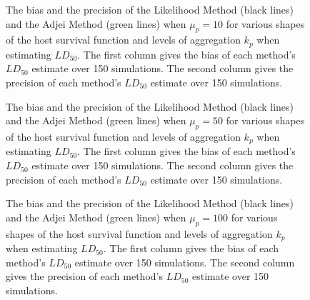 \documentclass[12pt, a4paper]{article}
\begin{document}
\begin{figure}


    \captionsetup{justification=raggedright, singlelinecheck=false}

    \caption{\doublespacing The bias and the precision of the Likelihood Method (black lines) and the Adjei Method (green lines) when $\mu_p = 10$ for various shapes of the host survival function and levels of aggregation $k_p$ when estimating $LD_{50}$.  The first column gives the bias of each method's $LD_{50}$ estimate over 150 simulations. The second column gives the precision of each method's $LD_{50}$ estimate over 150 simulations.}

    \label{fig:biasld50_10}

\end{figure}

\begin{figure}


    \captionsetup{justification=raggedright, singlelinecheck=false}

    \caption{\doublespacing The bias and the precision of the Likelihood Method (black lines) and the Adjei Method (green lines) when $\mu_p = 50$ for various shapes of the host survival function and levels of aggregation $k_p$ when estimating $LD_{50}$.  The first column gives the bias of each method's $LD_{50}$ estimate over 150 simulations. The second column gives the precision of each method's $LD_{50}$ estimate over 150 simulations.}

    \label{fig:biasld50_50}

\end{figure}

\begin{figure}


    \captionsetup{justification=raggedright, singlelinecheck=false}

    \caption{\doublespacing The bias and the precision of the Likelihood Method (black lines) and the Adjei Method (green lines) when $\mu_p = 100$ for various shapes of the host survival function and levels of aggregation $k_p$ when estimating $LD_{50}$.  The first column gives the bias of each method's $LD_{50}$ estimate over 150 simulations. The second column gives the precision of each method's $LD_{50}$ estimate over 150 simulations.}

    \label{fig:biasld50_100}

\end{figure}
\end{document}
